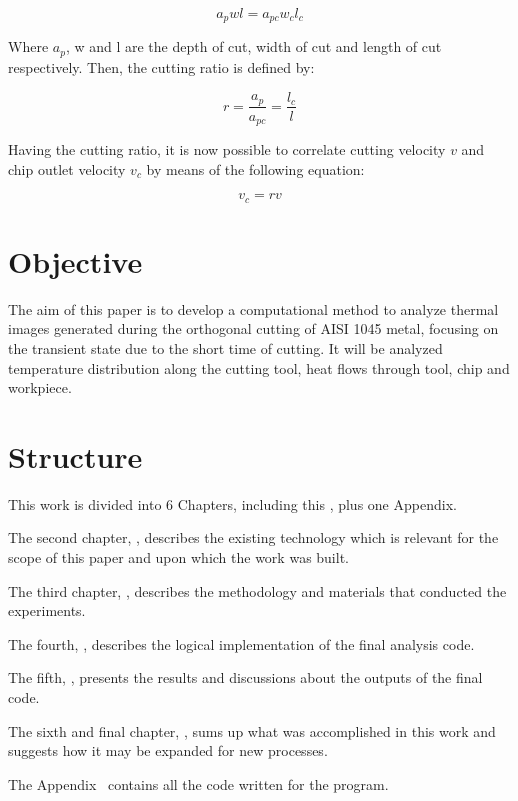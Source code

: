 	\begin{equation} 
	\label{}
	a_{p}wl = a_{pc}w_{c}l_{c}
	\end{equation}

	Where $a_{p}$, w and l are the depth of cut, width of cut and length of cut respectively. Then, the cutting ratio is defined by:

	\begin{equation} 
	\label{}
	r = \frac{a_{p}}{a_{pc}} = \frac{l_{c}}{l}
	\end{equation}

	Having the cutting ratio, it is now possible to correlate cutting velocity $v$ and chip outlet velocity $v_{c}$ by means of the following equation:

	\begin{equation} 
	\label{}
	v_{c} = rv
	\end{equation}
	
	\section{Objective}

	The aim of this paper is to develop a computational method to analyze thermal images generated during the orthogonal cutting of AISI 1045 metal, focusing on the transient state due to the short time of cutting. It will be analyzed temperature distribution along the cutting tool, heat flows through tool, chip and workpiece.

	\section{Structure}
	
	This work is divided into 6 Chapters, including this \textbf{}, plus one Appendix.
	
	The second chapter, \textbf{}, describes the existing technology which is relevant for the scope of this paper and upon which the work was built.

	The third chapter, \textbf{}, describes the methodology and materials that conducted the experiments.
	
	The fourth, \textbf{}, describes the logical implementation of the final analysis code.
	
	The fifth, \textbf{}, presents the results and discussions about the outputs of the final code.
	
	The sixth and final chapter, \textbf{}, sums up what was accomplished in this work and suggests how it may be expanded for new processes.
	
	The Appendix~\textbf{} contains all the code written for the program.